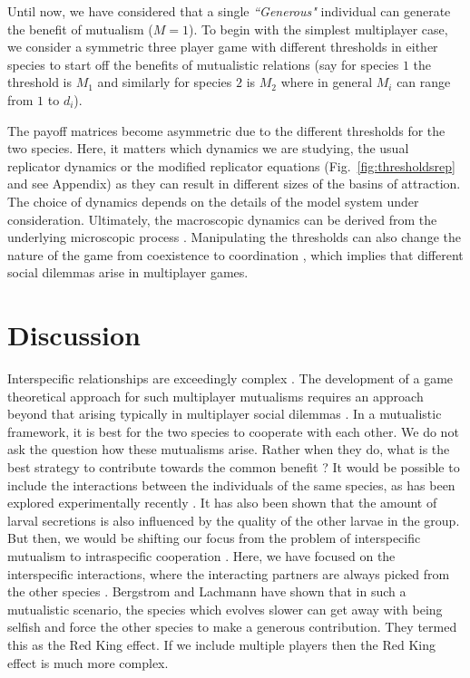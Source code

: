 \documentclass[aps,pre,amsfonts,floatfix, onecolumn,showkeys]{revtex4-1}
\begin{document}
Until now, we have considered that a single \textit{``Generous"} individual can generate the benefit of mutualism ($M=1$).
To begin with the simplest multiplayer case, we consider
a symmetric three player game with different thresholds in either species to start off the benefits of mutualistic relations (say for species $1$ the threshold is $M_1$ and similarly for species $2$ is $M_2$ where in general $M_i$ can range from $1$ to $d_i$).

The payoff matrices become asymmetric due to the different thresholds for the two species.
Here, it matters which dynamics we are studying, the usual replicator dynamics or the modified replicator equations (Fig.\ \ref{fig:thresholdsrep} and see Appendix) as they can result in different sizes of the basins of attraction.
The choice of dynamics depends on the details of the model system under consideration. 
Ultimately, the macroscopic dynamics can be derived from the underlying microscopic process \cite{traulsen:PRL:2005,black:TREE:2012}.
Manipulating the thresholds can also change the nature of the game from coexistence to coordination \cite{souza:JTB:2009},
which implies that different social dilemmas arise in multiplayer games.


\section{Discussion}

Interspecific relationships are exceedingly complex \cite{blaser:Nature:2007}.
The development of a game theoretical approach for such multiplayer mutualisms requires an approach beyond that arising typically in multiplayer social dilemmas \cite{bshary:ASB:2004}.
In a mutualistic framework, it is best for the two species to cooperate with each other.
We do not ask the question how these mutualisms arise. 
Rather when they do, what is the best strategy to contribute towards the common benefit \cite{bshary:book:2003,bowles:bookchapter:2003}?
It would be possible to include the interactions between the individuals of the same species, as has been explored experimentally recently \cite{wang:JRSI:2011}.
It has also been shown \cite{axen:BE:1998} that the amount of larval secretions is also influenced by the quality of the other larvae in the group.
But then, we would be shifting our focus from the problem of interspecific mutualism to intraspecific cooperation \cite{bshary:Nature:2008}.
Here, we have focused on the interspecific interactions, where the interacting partners are always picked from the other species \cite{schuster:BC:1981}.
Bergstrom and Lachmann have shown that in such a mutualistic scenario, the species which evolves slower can get away with being selfish and force the other species to make a generous contribution.
They termed this as the Red King effect.
If we include multiple players then the Red King effect is much more complex.
\end{document}
